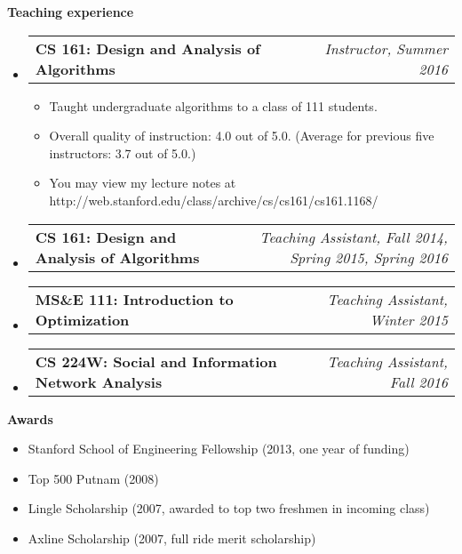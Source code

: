 \documentclass[letterpaper,10pt]{article}
\makeatletter
\newcommand{\resitem}[1]{\item #1 \vspace{-2pt}}
\newcommand{\resheading}[1]{{\large \colorbox{mygrey}{\begin{minipage}{\textwidth}{\textbf{#1 \vphantom{p\^{E}}}}\end{minipage}}}}
\newcommand{\ressubheading}[4]{
\begin{tabular*}{7.0in}{l@{\extracolsep{\fill}}r}
		\textbf{#1} & \textit{#4} \\
\end{tabular*}\vspace{-6pt}}
\makeatother
\begin{document}
\begin{itemize}
\end{itemize}

%
%

\resheading{Teaching experience}
\begin{itemize}
\item
	\ressubheading{CS 161: Design and Analysis of Algorithms}{Stanford, CA}{Instructor}{Instructor, Summer 2016}
	\begin{itemize}
	\item Taught undergraduate algorithms to a class of 111 students.
	\item Overall quality of instruction: 4.0 out of 5.0.  (Average for previous five instructors: 3.7 out of 5.0.)
	\item You may view my lecture notes at http://web.stanford.edu/class/archive/cs/cs161/cs161.1168/
	\end{itemize}
\item
	\ressubheading{CS 161: Design and Analysis of Algorithms}{Stanford, CA}{Teaching Assistant}{Teaching Assistant, Fall 2014, Spring 2015, Spring 2016}
\item
	\ressubheading{MS\&E 111: Introduction to Optimization}{Stanford, CA}{Teaching Assistant}{Teaching Assistant, Winter 2015}
\item
	\ressubheading{CS 224W: Social and Information Network Analysis}{Stanford, CA}{Teaching Assistant}{Teaching Assistant, Fall 2016}
\end{itemize}

\resheading{Awards}
\begin{itemize}
	\item Stanford School of Engineering Fellowship (2013, one year of funding)
	\item Top 500 Putnam (2008)
	\item Lingle Scholarship (2007, awarded to top two freshmen in incoming class)
	\item Axline Scholarship (2007, full ride merit scholarship)
\end{itemize}
\end{document}
